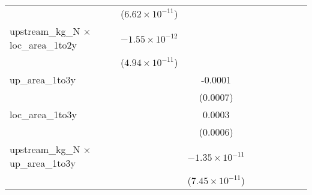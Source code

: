 \begin{tabular}{lcccccccc}
                                                  & ($6.62\times 10^{-11}$)  &                          &                          &                          &                          &                          &                          &   \\   
   upstream\_kg\_N $\times$ loc\_area\_1to2y      & $-1.55\times 10^{-12}$   &                          &                          &                          &                          &                          &                          &   \\   
                                                  & ($4.94\times 10^{-11}$)  &                          &                          &                          &                          &                          &                          &   \\   
   up\_area\_1to3y                                &                          & -0.0001                  &                          &                          &                          &                          &                          &   \\   
                                                  &                          & (0.0007)                 &                          &                          &                          &                          &                          &   \\   
   loc\_area\_1to3y                               &                          & 0.0003                   &                          &                          &                          &                          &                          &   \\   
                                                  &                          & (0.0006)                 &                          &                          &                          &                          &                          &   \\   
   upstream\_kg\_N $\times$ up\_area\_1to3y       &                          & $-1.35\times 10^{-11}$   &                          &                          &                          &                          &                          &   \\   
                                                  &                          & ($7.45\times 10^{-11}$)  &                          &                          &                          &                          &                          &   \\   

\end{tabular}
